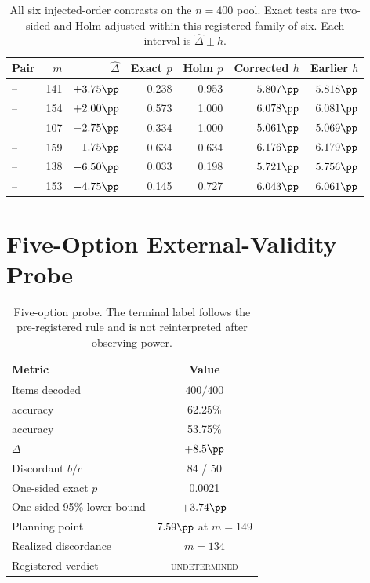 \begin{table}[H]
\centering
\small
\setlength{\tabcolsep}{4pt}
\caption{All six injected-order contrasts on the $n=400$ pool.  Exact tests
are two-sided and Holm-adjusted within this registered family of six.  Each
interval is $\widehat\Delta\pm h$.}
\label{tab:order-six-ci}
\begin{tabular}{@{}lrrrrrr@{}}
\toprule
Pair & $m$ & $\widehat\Delta$ & Exact $p$ & Holm $p$ & Corrected $h$ & Earlier $h$ \\
\midrule
\sconf{}--\rinj{} & 141 & $+3.75\pp$ & 0.238 & 0.953 & $5.807\pp$ & $5.818\pp$ \\
\sconf{}--\ainj{} & 154 & $+2.00\pp$ & 0.573 & 1.000 & $6.078\pp$ & $6.081\pp$ \\
\sconf{}--\finj{} & 107 & $-2.75\pp$ & 0.334 & 1.000 & $5.061\pp$ & $5.069\pp$ \\
\rinj{}--\ainj{} & 159 & $-1.75\pp$ & 0.634 & 0.634 & $6.176\pp$ & $6.179\pp$ \\
\rinj{}--\finj{} & 138 & $-6.50\pp$ & 0.033 & 0.198 & $5.721\pp$ & $5.756\pp$ \\
\ainj{}--\finj{} & 153 & $-4.75\pp$ & 0.145 & 0.727 & $6.043\pp$ & $6.061\pp$ \\
\bottomrule
\end{tabular}
\end{table}

\section{Five-Option External-Validity Probe}
\label{app:5option}

\begin{table}[H]
\centering
\small
\caption{Five-option probe.  The terminal label follows the pre-registered
rule and is not reinterpreted after observing power.}
\label{tab:5option}
\begin{tabular}{@{}lc@{}}
\toprule
Metric & Value \\
\midrule
Items decoded & $400/400$ \\
\sconf{} accuracy & 62.25\% \\
\rinj{} accuracy & 53.75\% \\
$\Delta$ & $+8.5\pp$ \\
Discordant $b/c$ & 84 / 50 \\
One-sided exact $p$ & 0.0021 \\
One-sided 95\% lower bound & $+3.74\pp$ \\
Planning point & $7.59\pp$ at $m=149$ \\
Realized discordance & $m=134$ \\
Registered verdict & \textsc{undetermined} \\
\bottomrule
\end{tabular}
\end{table}

